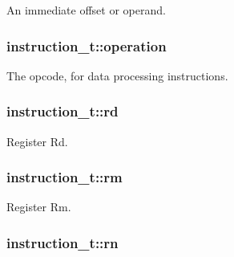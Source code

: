 An immediate offset or operand. 

\subsubsection[{\texorpdfstring{operation}{operation}}]{ instruction\+\_\+t\+::operation}\hypertarget{structinstruction__t_ae29eba9c0dfbec4abcd24cf4a927d2b7}{}\label{structinstruction__t_ae29eba9c0dfbec4abcd24cf4a927d2b7}


The opcode, for data processing instructions. 

\subsubsection[{\texorpdfstring{rd}{rd}}]{ instruction\+\_\+t\+::rd}\hypertarget{structinstruction__t_a8ab8a544fae4f96f3ebf0b8b36ac3e1d}{}\label{structinstruction__t_a8ab8a544fae4f96f3ebf0b8b36ac3e1d}


Register Rd. 

\subsubsection[{\texorpdfstring{rm}{rm}}]{ instruction\+\_\+t\+::rm}\hypertarget{structinstruction__t_aeff2b2015b47eb6c511d57c058435fb3}{}\label{structinstruction__t_aeff2b2015b47eb6c511d57c058435fb3}


Register Rm. 

\subsubsection[{\texorpdfstring{rn}{rn}}]{ instruction\+\_\+t\+::rn}\hypertarget{structinstruction__t_a5ecf8ae8f3708affd90f22df5af80881}{}\label{structinstruction__t_a5ecf8ae8f3708affd90f22df5af80881}


